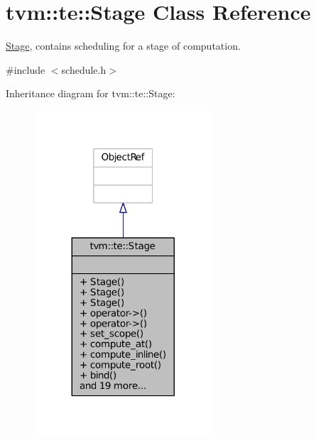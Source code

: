 \hypertarget{classtvm_1_1te_1_1Stage}{}\section{tvm\+:\+:te\+:\+:Stage Class Reference}
\label{classtvm_1_1te_1_1Stage}


\hyperlink{classtvm_1_1te_1_1Stage}{Stage}, contains scheduling for a stage of computation.  




{\ttfamily \#include $<$schedule.\+h$>$}



Inheritance diagram for tvm\+:\+:te\+:\+:Stage\+:
\nopagebreak
\begin{figure}[H]
\begin{center}
\leavevmode
\includegraphics[width=188pt]{classtvm_1_1te_1_1Stage__inherit__graph}
\end{center}
\end{figure}


